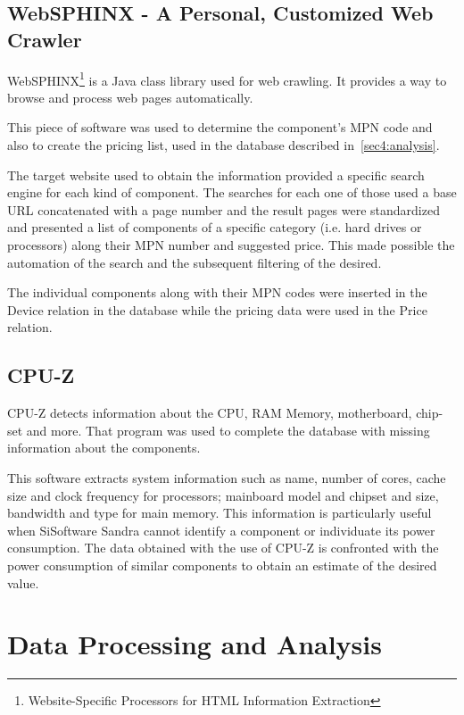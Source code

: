     \subsection{WebSPHINX - A Personal, Customized Web Crawler} \label{sec3:websphinx}
        WebSPHINX\footnote{Website-Specific Processors for HTML Information Extraction} is a Java class library used for web crawling. It provides a way to browse and process web pages automatically.
        
        This piece of software was used to determine the component's MPN code and also to create the pricing list, used in the database described in~\ref{sec4:analysis}.

        The target website used to obtain the information provided a specific search engine for each kind of component. The searches for each one of those used a base URL concatenated with a page number and the result pages were standardized and presented a list of components of a specific category (i.e. hard drives or processors) along their MPN number and suggested price. This made possible the automation of the search and the subsequent filtering of the desired.
        
        The individual components along with their MPN codes were inserted in the Device relation in the database while the pricing data were used in the Price relation.
        

    \subsection{CPU-Z} \label{sec3:cpu-z}
        CPU-Z detects information about the CPU, RAM Memory, motherboard, chip-set and more. That program was used to complete the database with missing information about the components.

        This software extracts system information such as name, number of cores, cache size and clock frequency for processors; mainboard model and chipset and size, bandwidth and type for main memory. This information is particularly useful when SiSoftware Sandra cannot identify a component or individuate its power consumption. The data obtained with the use of CPU-Z is confronted with the power consumption of similar components to obtain an estimate of the desired value.

\section{Data Processing and Analysis} \label{sec3:data_processing_analysis}
    
